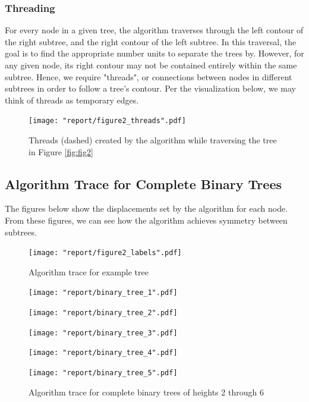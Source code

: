 \documentclass[11pt]{report}
\begin{document}
\subsubsection{Threading}
For every node in a given tree, the algorithm traverses through the left contour of the right subtree, and the right contour of the left subtree. In this traversal, the goal is to find the appropriate number units to separate the trees by. However, for any given node, its right contour may not be contained entirely within the same subtree. Hence, we require "threads", or connections between nodes in different subtrees in order to follow a tree's contour. Per the visualization below, we may think of threads as temporary edges.

\begin{figure}[H]
    \centering
    \texttt{[image: "report/figure2\_threads".pdf]}
    \caption{Threads (dashed) created by the algorithm while traversing the tree in Figure \ref{fig:fig2} }
\end{figure}

\subsection{Algorithm Trace for Complete Binary Trees}
The figures below show the displacements set by the algorithm for each node. From these figures, we can see how the algorithm achieves symmetry between subtrees.

\begin{figure}[H]
    \centering
    \texttt{[image: "report/figure2\_labels".pdf]}
    \caption{Algorithm trace for example tree}
\end{figure}

\begin{figure}[H]   
    \texttt{[image: "report/binary\_tree\_1".pdf]}
    \linebreak
    
    \texttt{[image: "report/binary\_tree\_2".pdf]}
    \linebreak
    
    \texttt{[image: "report/binary\_tree\_3".pdf]}
    \linebreak
    
    \texttt{[image: "report/binary\_tree\_4".pdf]}
    \linebreak
    
    \texttt{[image: "report/binary\_tree\_5".pdf]}
    \linebreak
    
    \caption{Algorithm trace for complete binary trees of heights 2 through 6}
\end{figure}
\fi
\end{document}
